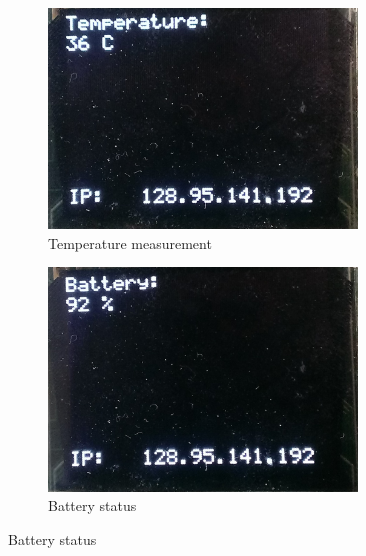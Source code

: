 \documentclass[12pt]{article} %
\begin{document}
\begin{itemize}
\begin{figure}[p]
			\begin{subfigure}[t]{0.48\textwidth}
				\centering
				\includegraphics[width=0.9\textwidth]{../design/oled_temp.jpg}
				\caption{Temperature measurement}
				\label{fig:temp_disp}
			\end{subfigure}
			\hfill
			\begin{subfigure}[t]{0.48\textwidth}
				\centering
				\includegraphics[width=0.9\textwidth]{../design/oled_battery.jpg}
				\caption{Battery status}
				\label{fig:battery_disp}
			\end{subfigure}


\end{figure}
\end{itemize}
\end{document}
